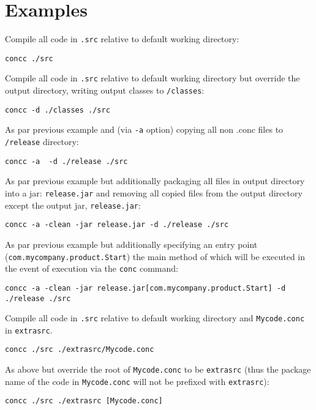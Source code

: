 \documentclass[conc-doc]{subfiles}
\begin{document}
\section{Examples}
Compile all code in \lstinline{.src} relative to default working directory:
\begin{lstlisting}
concc ./src 
\end{lstlisting}

Compile all code in \lstinline{.src} relative to default working directory but override the output directory, writing output classes to \lstinline{/classes}:
\begin{lstlisting}
concc -d ./classes ./src 
\end{lstlisting}

As par previous example and (via \lstinline{-a} option) copying all non .conc files to \lstinline{/release} directory:
\begin{lstlisting}
concc -a  -d ./release ./src 
\end{lstlisting}

As par previous example but additionally packaging all files in output directory into a jar: \lstinline{release.jar} and removing all copied files from the output directory except the output jar, \lstinline{release.jar}:
\begin{lstlisting}
concc -a -clean -jar release.jar -d ./release ./src 
\end{lstlisting}

As par previous example but additionally specifying an entry point (\lstinline{com.mycompany.product.Start}) the main method of which will be executed in the event of execution via the \lstinline{conc} command:
\begin{lstlisting}
concc -a -clean -jar release.jar[com.mycompany.product.Start] -d ./release ./src 
\end{lstlisting}

Compile all code in \lstinline{.src} relative to default working directory and \lstinline{Mycode.conc} in \lstinline{extrasrc}.
\begin{lstlisting}
concc ./src ./extrasrc/Mycode.conc
\end{lstlisting}

As above but override the root of \lstinline{Mycode.conc} to be \lstinline{extrasrc} (thus the package name of the code in \lstinline{Mycode.conc} will not be prefixed with \lstinline{extrasrc}):
\begin{lstlisting}
concc ./src ./extrasrc [Mycode.conc]
\end{lstlisting}
\end{document}

